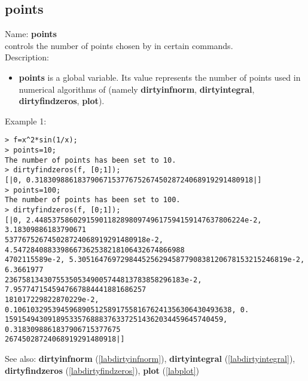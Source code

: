\subsection{points}
\label{labpoints}
\noindent Name: \textbf{points}\\
controls the number of points chosen by \sollya in certain commands.\\

\noindent Description: \begin{itemize}

\item \textbf{points} is a global variable. Its value represents the number of points
   used in numerical algorithms of \sollya (namely \textbf{dirtyinfnorm},
   \textbf{dirtyintegral}, \textbf{dirtyfindzeros}, \textbf{plot}).
\end{itemize}
\noindent Example 1: 
\begin{center}\begin{minipage}{15cm}\begin{Verbatim}[frame=single]
> f=x^2*sin(1/x);
> points=10;
The number of points has been set to 10.
> dirtyfindzeros(f, [0;1]);
[|0, 0.318309886183790671537767526745028724068919291480918|]
> points=100;
The number of points has been set to 100.
> dirtyfindzeros(f, [0;1]);
[|0, 2.4485375860291590118289809749617594159147637806224e-2, 3.18309886183790671
537767526745028724068919291480918e-2, 4.5472840883398667362538218106432674866988
4702115589e-2, 5.3051647697298445256294587790838120678153215246819e-2, 6.3661977
236758134307553505349005744813783858296183e-2, 7.9577471545947667884441881686257
181017229822870229e-2, 0.106103295394596890512589175581676241356306430493638, 0.
159154943091895335768883763372514362034459645740459, 0.3183098861837906715377675
26745028724068919291480918|]
\end{Verbatim}
\end{minipage}\end{center}
See also: \textbf{dirtyinfnorm} (\ref{labdirtyinfnorm}), \textbf{dirtyintegral} (\ref{labdirtyintegral}), \textbf{dirtyfindzeros} (\ref{labdirtyfindzeros}), \textbf{plot} (\ref{labplot})
